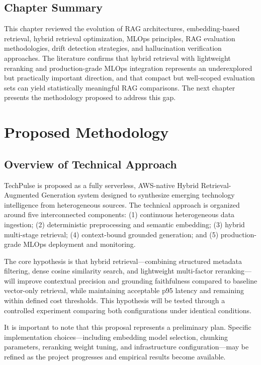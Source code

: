 \documentclass[12pt,a4paper]{report}
\begin{document}
\section{Chapter Summary}

This chapter reviewed the evolution of RAG architectures, embedding-based retrieval, hybrid retrieval optimization, MLOps principles, RAG evaluation methodologies, drift detection strategies, and hallucination verification approaches. The literature confirms that hybrid retrieval with lightweight reranking and production-grade MLOps integration represents an underexplored but practically important direction, and that compact but well-scoped evaluation sets can yield statistically meaningful RAG comparisons. The next chapter presents the methodology proposed to address this gap.

\chapter{Proposed Methodology}

\section{Overview of Technical Approach}
\label{sec:method_overview}

TechPulse is proposed as a fully serverless, AWS-native Hybrid Retrieval-Augmented Generation system designed to synthesize emerging technology intelligence from heterogeneous sources. The technical approach is organized around five interconnected components: (1) continuous heterogeneous data ingestion; (2) deterministic preprocessing and semantic embedding; (3) hybrid multi-stage retrieval; (4) context-bound grounded generation; and (5) production-grade MLOps deployment and monitoring.

The core hypothesis is that hybrid retrieval—combining structured metadata filtering, dense cosine similarity search, and lightweight multi-factor reranking—will improve contextual precision and grounding faithfulness compared to baseline vector-only retrieval, while maintaining acceptable p95 latency and remaining within defined cost thresholds. This hypothesis will be tested through a controlled experiment comparing both configurations under identical conditions.

It is important to note that this proposal represents a preliminary plan. Specific implementation choices—including embedding model selection, chunking parameters, reranking weight tuning, and infrastructure configuration—may be refined as the project progresses and empirical results become available.
\end{document}
